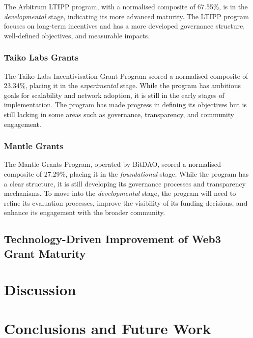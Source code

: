 \documentclass[conference]{IEEEtran}
\begin{document}
The Arbitrum LTIPP program, with a normalised composite of 67.55\%, is in the \textit{developmental} stage, indicating its more advanced maturity. The LTIPP program focuses on long-term incentives and has a more developed governance structure, well-defined objectives, and measurable impacts.

\subsubsection{Taiko Labs Grants}\label{sec_4.2.3}
The Taiko Labs Incentivisation Grant Program scored a normalised composite of 23.34\%, placing it in the \textit{experimental} stage. While the program has ambitious goals for scalability and network adoption, it is still in the early stages of implementation. The program has made progress in defining its objectives but is still lacking in some areas such as governance, transparency, and community engagement.

\subsubsection{Mantle Grants}\label{sec_4.2.4}
The Mantle Grants Program, operated by BitDAO, scored a normalised composite of 27.29\%, placing it in the \textit{foundational} stage. While the program has a clear structure, it is still developing its governance processes and transparency mechanisms. To move into the \textit{developmental} stage, the program will need to refine its evaluation processes, improve the visibility of its funding decisions, and enhance its engagement with the broader community.


\subsection{Technology-Driven Improvement of Web3 Grant Maturity}\label{sec_4.3}




\section{Discussion}\label{sec_5}











\section{Conclusions and Future Work}\label{sec_6}
\end{document}
